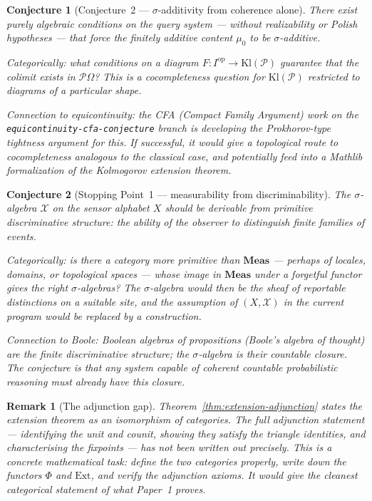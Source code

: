 \documentclass[11pt]{article}
\newtheorem{remark}{Remark}
\newtheorem{conjecture}{Conjecture}
\newcommand{\Meas}{\mathbf{Meas}}
\newcommand{\Kl}{\mathrm{Kl}}
\newcommand{\Pcal}{\mathcal{P}}
\newcommand{\Xcal}{\mathcal{X}}
\newcommand{\op}{\mathrm{op}}
\begin{document}
\begin{conjecture}[Conjecture~2 --- $\sigma$-additivity from coherence alone]
\label{conj:sigma-additivity}
There exist purely algebraic conditions on the query system --- without
realizability or Polish hypotheses --- that force the finitely additive content
$\mu_0$ to be $\sigma$-additive.

\emph{Categorically}: what conditions on a diagram $F : I^\op \to \Kl(\Pcal)$
guarantee that the colimit exists in $\Pcal\Omega$?  This is a cocompleteness
question for $\Kl(\Pcal)$ restricted to diagrams of a particular shape.

\emph{Connection to equicontinuity}: the CFA (Compact Family Argument) work
on the \texttt{equicontinuity-cfa-conjecture} branch is developing the
Prokhorov-type tightness argument for this.  If successful, it would give a
topological route to cocompleteness analogous to the classical case, and
potentially feed into a Mathlib formalization of the Kolmogorov extension
theorem.
\end{conjecture}

\begin{conjecture}[Stopping Point~1 --- measurability from discriminability]
\label{conj:measurability}
The $\sigma$-algebra $\Xcal$ on the sensor alphabet $X$ should be derivable
from primitive discriminative structure: the ability of the observer to
distinguish finite families of events.

\emph{Categorically}: is there a category more primitive than $\Meas$ ---
perhaps of \emph{locales}, \emph{domains}, or \emph{topological spaces} ---
whose image in $\Meas$ under a forgetful functor gives the right
$\sigma$-algebras?  The $\sigma$-algebra would then be the \emph{sheaf of
reportable distinctions} on a suitable site, and the assumption of $(X, \Xcal)$
in the current program would be replaced by a construction.

\emph{Connection to Boole}: Boolean algebras of propositions (Boole's algebra
of thought) are the finite discriminative structure; the $\sigma$-algebra is
their countable closure.  The conjecture is that any system capable of
coherent countable probabilistic reasoning must already have this closure.
\end{conjecture}

\begin{remark}[The adjunction gap]
Theorem~\ref{thm:extension-adjunction} states the extension theorem as an
isomorphism of categories.  The full adjunction statement --- identifying the
unit and counit, showing they satisfy the triangle identities, and characterising
the fixpoints --- has not been written out precisely.  This is a concrete
mathematical task: define the two categories properly, write down the functors
$\Phi$ and $\mathrm{Ext}$, and verify the adjunction axioms.  It would give
the cleanest categorical statement of what Paper~1 proves.
\end{remark}
\end{document}
